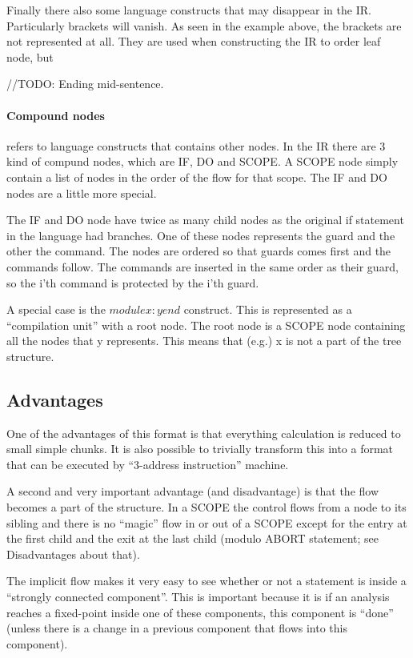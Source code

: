 Finally there also some language constructs that may disappear in the IR. Particularly
brackets will vanish. As seen in the example above, the brackets are not represented at
all. They are used when constructing the IR to order leaf node, but 

//TODO: Ending mid-sentence.

\paragraph*{Compound nodes}
refers to language constructs that contains other nodes. In the IR there are 3 kind of
compund nodes, which are IF, DO and SCOPE. A SCOPE node simply contain a list of nodes
in the order of the flow for that scope. The IF and DO nodes are a little more special.

  The IF and DO node have twice as many child nodes as the original if statement in the
language had branches. One of these nodes represents the guard and the other the command.
The nodes are ordered so that guards comes first and the commands follow. The commands
are inserted in the same order as their guard, so the i'th command is protected by the
i'th guard.

\docpar
A special case is the $module x : y end$ construct. This is represented as a ``compilation
unit'' with a root node. The root node is a SCOPE node containing all the nodes that y
represents. This means that (e.g.) x is not a part of the tree structure.

\subsection{Advantages}
One of the advantages of this format is that everything calculation is reduced to
small simple chunks. It is also possible to trivially transform this into a format
that can be executed by ``3-address instruction'' machine.

A second and very important advantage (and disadvantage) is that the flow becomes
a part of the structure. In a SCOPE the control flows from a node to its sibling
and there is no ``magic'' flow in or out of a SCOPE except for the entry at the
first child and the exit at the last child (modulo ABORT statement; see
Disadvantages about that).

  The implicit flow makes it very easy to see whether or not a statement is inside a
``strongly connected component''. This is important because it is if an analysis reaches
a fixed-point inside one of these components, this component is ``done'' (unless there is
a change in a previous component that flows into this component).

